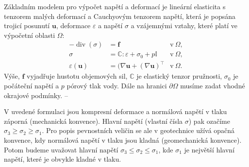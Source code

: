 \documentclass{article}
\def\eps{\varepsilon}
\def\T{\intercal}
\def\div{\operatorname{div}}
\def\vc#1{\mathbf{\boldsymbol{#1}}}     %
\def\tn#1{{\mathbb{#1}}}    %
\begin{document}
Základním modelem pro výpočet napětí a deformací je lineární elasticita s tenzorem malých deformací a Cauchyovým tenzorem napětí, která je popsána trojicí posunutí $\vc u$, deformace $\eps$ a napětí $\sigma$ a vzájemnými vztahy, které platí ve výpočetní oblasti $\Omega$:
\begin{align*}
	- \div(\sigma) &= \vc f &\mbox{v} \ \Omega, \\
	\sigma &= \tn C : \eps + \sigma_0 + p\tn I  &\mbox{v} \ \Omega, \\
	\eps(\vc u) &= (\nabla \vc u + (\nabla \vc u)^\T &\mbox{v} \ \Omega.
\end{align*}
Výše, $\vc f$ vyjadřuje hustotu objemových sil, $\tn C$ je elastický tenzor pružnosti, $\sigma_0$ je počáteční napětí a $p$ pórový tlak vody. 
Dále na hranici $\partial \Omega$ musíme zadat vhodné okrajové podmínky. --

V uvedené formulaci jsou kompresní deformace a normálová napětí v tlaku záporná (mechanická konvence). 
Hlavní napětí (vlastní čísla $\sigma$) pak ozačíme $\sigma_3 \geq \sigma_2 \geq \sigma_1$.
Pro popis pevnostních veličin se ale v geotechnice užívá opačná konvence, kdy normálová napětí v tlaku jsou kladná (geomechanická konvence).
Potom budeme uvažovat hlavní napětí $\sigma_3 \leq \sigma_2 \leq \sigma_1$, kde $\sigma_1$ je největší hlavní napětí, které je obvykle kladné v tlaku.
\end{document}

